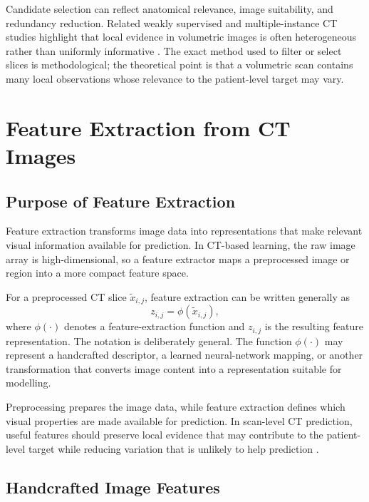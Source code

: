Candidate selection can reflect anatomical relevance, image suitability, and redundancy reduction. Related weakly supervised and multiple-instance CT studies highlight that local evidence in volumetric images is often heterogeneous rather than uniformly informative \cite{xue2023copdmil,djahnine2024weakly}. The exact method used to filter or select slices is methodological; the theoretical point is that a volumetric scan contains many local observations whose relevance to the patient-level target may vary.



\section{Feature Extraction from CT Images}
\label{sec:feature_extraction_ct_images}

\subsection{Purpose of Feature Extraction}
\label{sec:purpose_feature_extraction}

Feature extraction transforms image data into representations that make relevant visual information available for prediction. In CT-based learning, the raw image array is high-dimensional, so a feature extractor maps a preprocessed image or region into a more compact feature space.

For a preprocessed CT slice \(\tilde{x}_{i,j}\), feature extraction can be written generally as
\[
z_{i,j} = \phi(\tilde{x}_{i,j}),
\]
where \(\phi(\cdot)\) denotes a feature-extraction function and \(z_{i,j}\) is the resulting feature representation. The notation is deliberately general. The function \(\phi(\cdot)\) may represent a handcrafted descriptor, a learned neural-network mapping, or another transformation that converts image content into a representation suitable for modelling.

Preprocessing prepares the image data, while feature extraction defines which visual properties are made available for prediction. In scan-level CT prediction, useful features should preserve local evidence that may contribute to the patient-level target while reducing variation that is unlikely to help prediction \cite{rizzo2018radiomics,litjens2017survey}.



\subsection{Handcrafted Image Features}
\label{sec:handcrafted_image_features}

